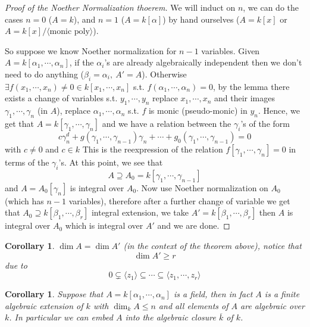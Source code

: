 \documentclass[11pt,a4paper]{article}
\theoremstyle{definition}
\theoremstyle{plain}
\newtheorem{corollary}[definition]{Corollary}
\theoremstyle{remark}
\newcommand{\angles}[1]{\langle #1 \rangle}
\begin{document}
\begin{proof}[Proof of the Noether Normalization thoerem]
    We will induct on $n$, we can do the cases $n = 0$ ($A = k$), and $n = 1$  ($A = k[\alpha]$) by hand ourselves ($A = k[x]$ or $A = k[x] / \angles{\text{monic poly}}$).

    So suppose we know Noether normalization for $n-1$ variables. Given $A = k[\alpha_1, \cdots, \alpha_n]$, if the $\alpha_i$'s are already algebraically independent 
    then we don't need to do anything ($\beta_i = \alpha_i, \ A' = A$). Otherwise $\exists f(x_1, \cdots, x_n) \ne 0 \in k[x_1, \cdots, x_n]$ s.t. $f(\alpha_1, \cdots, \alpha_n) = 0$, 
    by the lemma there exists a change of variables s.t. $y_1, \cdots, y_n$ replace $x_1, \cdots, x_n$ and their images $\gamma_1, \cdots, \gamma_n$ (in $A$), replace $\alpha_1, \cdots, \alpha_n$ s.t. 
    $f$ is monic (pseudo-monic) in $y_n$. Hence, we get that $A = k[\gamma_1, \cdots, \gamma_n]$ and we have a relation between the $\gamma_i$'s of the form 
    $$c \gamma_n^d + g(\gamma_1, \cdots, \gamma_{n-1}) \gamma_n + \cdots + g_0 (\gamma_1, \cdots, \gamma_{n-1}) = 0$$
    with $c \ne 0$ and $c \in k$ This is the reexpression of the relation $f[\gamma_1, \cdots, \gamma_n] = 0$ in terms of the $\gamma_i$'s. At this point, we see that 
    $$A \supseteq A_0 = k[\gamma_1, \cdots, \gamma_{n-1}]$$
    and $A = A_0[\gamma_n]$ is integral over $A_0$. Now use Noether normalization on $A_0$ (which has $n-1$ variables), therefore after a further change of variable we get that 
    $A_0 \supseteq k[\beta_1, \cdots, \beta_r]$ integral extension, we take $A' = k[\beta_1, \cdots, \beta_r]$ then $A$ is integral over $A_0$ which is integral over $A'$ and we are done.  
\end{proof}

\begin{corollary}
    $\dim A = \dim A'$ (in the context of the theorem above), notice that 
    $$\dim A' \ge r$$ 
    due to 
    $$0 \subsetneq \angles{z_1} \subseteq \cdots \subseteq \angles{z_1, \cdots, z_r}$$
\end{corollary}

\begin{corollary}
    Suppose that $A = k[{\alpha_1, \cdots, \alpha_n}]$ is a field, then in fact $A$ is a finite algebraic extension of $k$ 
    with $\dim_k A \le n$ and all elements of $A$ are algebraic over $k$. In particular we can embed $A$ into the 
    algebraic closure $\overline{k}$ of $k$.
\end{corollary}
\end{document}
